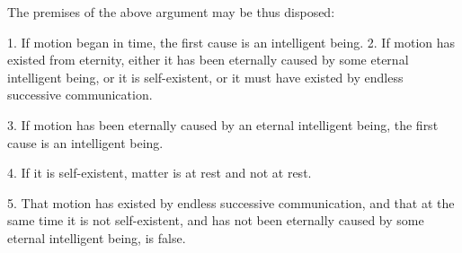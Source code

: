 \documentclass[oneside]{book}
\begin{document}
The premises of the above argument may be thus disposed:

1. If motion began in time, the first cause is an intelligent
being.
2. If motion has existed from eternity, either it has been
eternally caused by some eternal intelligent being, or it is self-existent,
or it must have existed by endless successive communication.

3. If motion has been eternally caused by an eternal intelligent
being, the first cause is an intelligent being.

4. If it is self-existent, matter is at rest and not at rest.

5. That motion has existed by endless successive communication,
and that at the same time it is not self-existent, and has
not been eternally caused by some eternal intelligent being, is
false.
\end{document}
